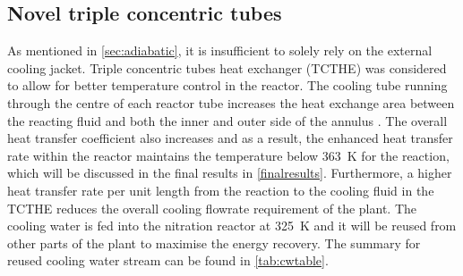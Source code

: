 \subsection{Novel triple concentric tubes}
\label{sec:tripleconctube}
As mentioned in \cref{sec:adiabatic}, it is insufficient to solely rely on the external cooling jacket. Triple concentric tubes heat exchanger (TCTHE) was considered to allow for better temperature control in the reactor. The cooling tube running through the centre of each reactor tube increases the heat exchange area between the reacting fluid and both the inner and outer side of the annulus \cite{moya-rico_characterization_2019}. The overall heat transfer coefficient also increases \cite{radulescu_analysis_2016} and as a result, the enhanced heat transfer rate within the reactor maintains the temperature below \SI{363}{\K} for the reaction, which will be discussed in the final results in \cref{finalresults}. Furthermore, a higher heat transfer rate per unit length from the reaction to the cooling fluid in the TCTHE reduces the overall cooling flowrate requirement of the plant. The cooling water is fed into the nitration reactor at \SI{325}{\K} and it will be reused from other parts of the plant to maximise the energy recovery. The summary for reused cooling water stream can be found in \cref{tab:cwtable}.
